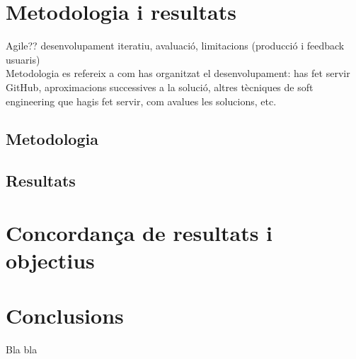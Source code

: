 \documentclass[12pt,a4paper,openright,oneside]{article}
\numberwithin{equation}{section}
\theoremstyle{definition}
\begin{document}
\newpage

\section{Metodologia i resultats}
Agile??
desenvolupament iteratiu, avaluació, limitacions (producció i feedback usuaris)\\
Metodologia es refereix a com has organitzat el desenvolupament: has fet servir GitHub, aproximacions successives a la solució, altres tècniques de soft engineering que hagis fet servir, com avalues les solucions, etc.

\subsection{Metodologia}
\subsection{Resultats}

\newpage

\section{Concordança de resultats i objectius}

\newpage

\section{Conclusions}

Bla bla

\normalfont

\newpage
\end{document}
